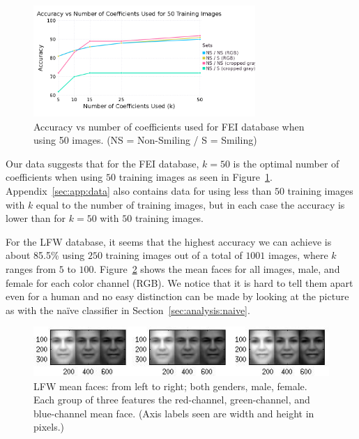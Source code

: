 \documentclass[hidelinks,11pt]{article}
\begin{document}
\begin{figure}[!ht]
  \centering
  \includegraphics[width=0.75\textwidth]{accuracy_k.png}
  \caption{Accuracy vs number of coefficients used for FEI database when using
  50 images. (NS = Non-Smiling / S = Smiling)}
  \label{fig:analysis:lda:accuracy_fei}
\end{figure}

Our data suggests that for the FEI database, $k = 50$ is the optimal number of
coefficients when using $50$ training images as seen in
Figure~\ref{fig:analysis:lda:accuracy_fei}. Appendix~\ref{sec:app:data} also
contains data for using less than $50$ training images with $k$ equal to the
number of training images, but in each case the accuracy is lower than for $k =
50$ with $50$ training images.

For the LFW database, it seems that the highest accuracy we can achieve is about
85.5\% using $250$ training images out of a total of $1001$ images, where $k$
ranges from $5$ to $100$. Figure~\ref{fig:analysis:lda:mean} shows the mean
faces for all images, male, and female for each color channel (RGB). We notice
that it is hard to tell them apart even for a human and no easy distinction can
be made by looking at the picture as with the na\"ive classifier in
Section~\ref{sec:analysis:naive}. 

\begin{figure}[!ht]
  \centering
  \includegraphics{avg.jpg}
  \caption{LFW mean faces: from left to right; both genders, male, female. Each
  group of three features the red-channel, green-channel, and blue-channel mean
  face. (Axis labels seen are width and height in pixels.)}
  \label{fig:analysis:lda:mean}
\end{figure}
\end{document}

